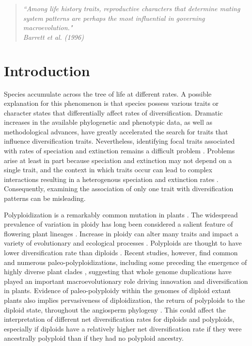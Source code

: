 \begin{quote}
\em{``Among life history traits, reproductive characters that determine mating system patterns are perhaps the most influential in governing macroevolution." 
}
\\
\hspace*{\fill}\rm{ Barrett et al. (1996)}
\end{quote}

\section{Introduction}

Species accumulate across the tree of life at different rates. 
A possible explanation for this phenomenon is that species possess various traits or character states that differentially affect rates of diversification. 
Dramatic increases in the available phylogenetic and phenotypic data, as well as methodological advances, have greatly accelerated the search for traits that influence diversification traits.
Nevertheless, identifying focal traits associated with rates of speciation and extinction remains a difficult problem \citep[\eg][]{maddison_2015, rabosky_2015, moore_2016, fitzjohn_2009, goldberg_2012, beaulieu_2016, rabosky_2017}. 
Problems arise at least in part because speciation and extinction may not depend on a single trait, and the context in which traits occur can lead to complex interactions resulting in a heterogenous speciation and extinction rates \citep{beaulieu_2016, caetano_2018, herrera_2018}.
Consequently, examining the association of only one trait with diversification patterns can be misleading. 

Polyploidization is a remarkably common mutation in plants \citep{husband_2013, zenilferguson_2017}.
The widespread prevalence of variation in ploidy has long been considered a salient feature of flowering plant lineages \citep{stebbins1938}. 
Increase in ploidy can alter many traits and impact a variety of evolutionary \citep{ramsey_2002} and ecological processes \citep{sessa_2019}.
%
Polyploids are thought to have lower diversification rate than diploids \citep{mayrose_2011, mayrose_2015}. 
Recent studies, however, find common and numerous paleo-polyploidizations, including some preceding the emergence of highly diverse plant clades \citep{soltis_2014, landis_2018}, suggesting that whole genome duplications have played an important macroevolutionary role driving innovation and diversification in plants. 
Evidence of paleo-polyploidy within the genomes of diploid extant plants also implies pervasiveness of diploidization, the return of polyploids to the diploid state, throughout the angiosperm phylogeny \citep{soltis_2015, dodsworth_2015}.
This could affect the interpretation of different net diversification rates for diploids and polyploids, especially if diploids have a relatively higher net diversification rate if they were ancestrally polyploid than if they had no polyploid ancestry.

